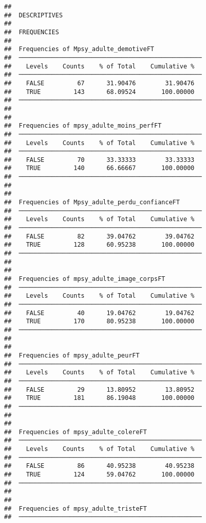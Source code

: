\documentclass[
]{article}
\begin{document}
\begin{verbatim}
## 
##  DESCRIPTIVES
## 
##  FREQUENCIES
## 
##  Frequencies of Mpsy_adulte_demotiveFT              
##  ────────────────────────────────────────────────── 
##    Levels    Counts    % of Total    Cumulative %   
##  ────────────────────────────────────────────────── 
##    FALSE         67      31.90476        31.90476   
##    TRUE         143      68.09524       100.00000   
##  ────────────────────────────────────────────────── 
## 
## 
##  Frequencies of mpsy_adulte_moins_perfFT            
##  ────────────────────────────────────────────────── 
##    Levels    Counts    % of Total    Cumulative %   
##  ────────────────────────────────────────────────── 
##    FALSE         70      33.33333        33.33333   
##    TRUE         140      66.66667       100.00000   
##  ────────────────────────────────────────────────── 
## 
## 
##  Frequencies of Mpsy_adulte_perdu_confianceFT       
##  ────────────────────────────────────────────────── 
##    Levels    Counts    % of Total    Cumulative %   
##  ────────────────────────────────────────────────── 
##    FALSE         82      39.04762        39.04762   
##    TRUE         128      60.95238       100.00000   
##  ────────────────────────────────────────────────── 
## 
## 
##  Frequencies of mpsy_adulte_image_corpsFT           
##  ────────────────────────────────────────────────── 
##    Levels    Counts    % of Total    Cumulative %   
##  ────────────────────────────────────────────────── 
##    FALSE         40      19.04762        19.04762   
##    TRUE         170      80.95238       100.00000   
##  ────────────────────────────────────────────────── 
## 
## 
##  Frequencies of mpsy_adulte_peurFT                  
##  ────────────────────────────────────────────────── 
##    Levels    Counts    % of Total    Cumulative %   
##  ────────────────────────────────────────────────── 
##    FALSE         29      13.80952        13.80952   
##    TRUE         181      86.19048       100.00000   
##  ────────────────────────────────────────────────── 
## 
## 
##  Frequencies of mpsy_adulte_colereFT                
##  ────────────────────────────────────────────────── 
##    Levels    Counts    % of Total    Cumulative %   
##  ────────────────────────────────────────────────── 
##    FALSE         86      40.95238        40.95238   
##    TRUE         124      59.04762       100.00000   
##  ────────────────────────────────────────────────── 
## 
## 
##  Frequencies of mpsy_adulte_tristeFT                
##  ────────────────────────────────────────────────── 

\end{verbatim}
\end{document}

